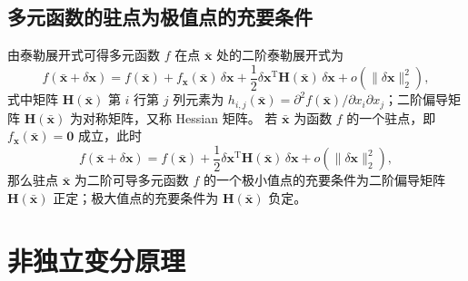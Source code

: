 \subsection{多元函数的驻点为极值点的充要条件}
由泰勒展开式可得多元函数 $f$ 在点 $\bar{\boldsymbol{x}}$ 处的二阶泰勒展开式为
\[
f(\bar{\boldsymbol{x}}+\delta\boldsymbol{x})=f(\bar{\boldsymbol{x}})+f_{\boldsymbol{x}}(\bar{\boldsymbol{x}})\,\delta\boldsymbol{x}+\frac{1}{2}\delta\boldsymbol{x}^{\mathrm{T}}\boldsymbol{H}(\bar{\boldsymbol{x}})\,\delta\boldsymbol{x}+o(\|\delta\boldsymbol{x}\|_2^2),
\]
式中矩阵 $\boldsymbol{H}(\bar{\boldsymbol{x}})$ 第 $i$ 行第 $j$ 列元素为 $h_{i,j}(\bar{\boldsymbol{x}})=\partial^2f(\bar{\boldsymbol{x}})/\partial x_i\partial x_j$；二阶偏导矩阵 $\boldsymbol{H}(\bar{\boldsymbol{x}})$ 为对称矩阵，又称 Hessian 矩阵。
若 $\bar{\boldsymbol{x}}$ 为函数 $f$ 的一个驻点，即 $f_{\boldsymbol{x}}(\bar{\boldsymbol{x}})=\boldsymbol{0}$ 成立，此时
\[
f(\bar{\boldsymbol{x}}+\delta\boldsymbol{x})=f(\bar{\boldsymbol{x}})+\frac{1}{2}\delta\boldsymbol{x}^{\mathrm{T}}\boldsymbol{H}(\bar{\boldsymbol{x}})\,\delta\boldsymbol{x}+o(\|\delta\boldsymbol{x}\|_2^2),
\]
那么驻点 $\bar{\boldsymbol{x}}$ 为二阶可导多元函数 $f$ 的一个极小值点的充要条件为二阶偏导矩阵 $\boldsymbol{H}(\bar{\boldsymbol{x}})$ 正定；极大值点的充要条件为 $\boldsymbol{H}(\bar{\boldsymbol{x}})$ 负定。
\section{非独立变分原理}
